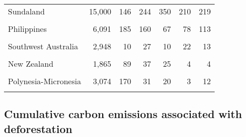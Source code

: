 \documentclass[
  12pt,
]{article}
\begin{document}
\begin{table}[H]
\begin{tabular}[t]{lrrrrrr}
Sundaland & 15,000 & 146 & 244 & 350 & 210 & 219\\
\cellcolor{gray!6}{Wallacea} & \cellcolor{gray!6}{1,500} & \cellcolor{gray!6}{265} & \cellcolor{gray!6}{99} & \cellcolor{gray!6}{50} & \cellcolor{gray!6}{33} & \cellcolor{gray!6}{144}\\
Philippines & 6,091 & 185 & 160 & 67 & 78 & 113\\
\cellcolor{gray!6}{Japan} & \cellcolor{gray!6}{1,950} & \cellcolor{gray!6}{15} & \cellcolor{gray!6}{28} & \cellcolor{gray!6}{52} & \cellcolor{gray!6}{46} & \cellcolor{gray!6}{52}\\
Southwest Australia & 2,948 & 10 & 27 & 10 & 22 & 13\\
\cellcolor{gray!6}{East Melanesian Islands} & \cellcolor{gray!6}{3,000} & \cellcolor{gray!6}{154} & \cellcolor{gray!6}{54} & \cellcolor{gray!6}{3} & \cellcolor{gray!6}{45} & \cellcolor{gray!6}{44}\\
New Zealand & 1,865 & 89 & 37 & 25 & 4 & 4\\
\cellcolor{gray!6}{New Caledonia} & \cellcolor{gray!6}{2,432} & \cellcolor{gray!6}{23} & \cellcolor{gray!6}{62} & \cellcolor{gray!6}{9} & \cellcolor{gray!6}{0} & \cellcolor{gray!6}{6}\\
Polynesia-Micronesia & 3,074 & 170 & 31 & 20 & 3 & 12\\
\cellcolor{gray!6}{Forests of East Australia} & \cellcolor{gray!6}{2,144} & \cellcolor{gray!6}{28} & \cellcolor{gray!6}{70} & \cellcolor{gray!6}{10} & \cellcolor{gray!6}{38} & \cellcolor{gray!6}{6}\\
\bottomrule
\end{tabular}
\end{table}

\newpage

\hypertarget{cumulative-carbon-emissions-associated-with-deforestation}{%
\subsection{Cumulative carbon emissions associated with deforestation}\label{cumulative-carbon-emissions-associated-with-deforestation}}



\begingroup\fontsize{11}{13}\selectfont
\end{document}
